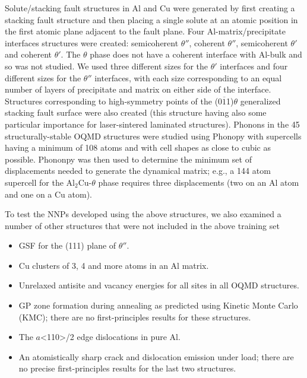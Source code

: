 \documentclass{article}
\begin{document}
Solute/stacking fault structures in Al and Cu were generated by first creating a stacking fault structure and then placing a single solute at an atomic position in the first atomic plane adjacent to the fault plane.
Four Al-matrix/precipitate interfaces structures were created: semicoherent $\theta''$, coherent $\theta''$,
semicoherent $\theta'$ and coherent $\theta'$. The $\theta$ phase does not have a coherent interface\cite{Nie2014PhysicalAlloys} with Al-bulk and so was not studied.
We used three different sizes for the $\theta'$ interfaces and four different sizes for the $\theta''$ interfaces, with each size corresponding to an equal number of layers of precipitate and matrix on either side of the interface. 
Structures corresponding to high-symmetry points of the (0$\overline{1}$1)$\theta$ generalized stacking fault surface were also created (this structure having also some particular importance for laser-sintered laminated structures\cite{Wang2018}).
Phonons in the 45 structurally-stable OQMD structures were studied using Phonopy\cite{Togo2015FirstScience} with supercells having a minimum of 108 atoms and with cell shapes as close to cubic as possible.
Phononpy was then used to determine the minimum set of displacements needed to generate the dynamical matrix; e.g., a 144 atom supercell for the Al$_2$Cu-$\theta$ phase requires three displacements (two on an Al atom and one on a Cu atom).


To test the NNPs developed using the above structures, we also examined a number of other structures that were not included in the above training set
\begin{itemize}
  
    \item GSF for the (111) plane of $\theta''$.
    \item Cu clusters of 3, 4 and more atoms in an Al matrix. 
    \item Unrelaxed antisite and vacancy energies for all sites in all OQMD structures. 
    \item GP zone formation during annealing as predicted using Kinetic Monte Carlo (KMC); there are no first-principles results for these structures.   
    \item The $a$<110>/2 edge dislocations in pure Al.
    \item An atomistically sharp crack and dislocation emission under load;
    there are no precise first-principles results for the last two structures. 
\end{itemize}
\end{document}
